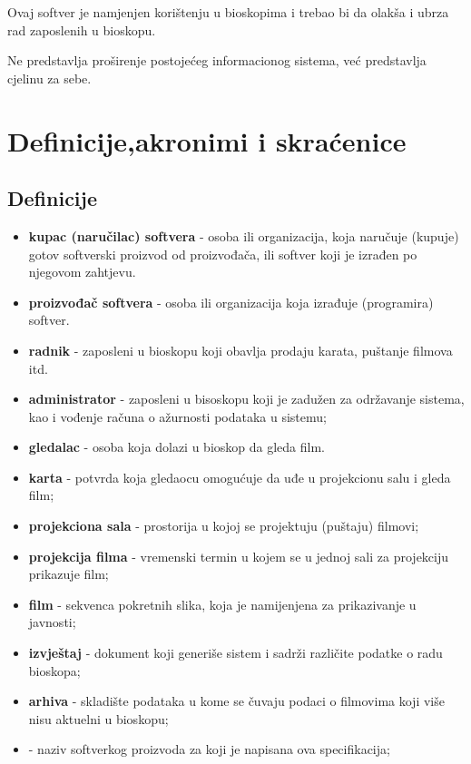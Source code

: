 Ovaj softver je namjenjen korištenju u bioskopima i trebao bi da olakša i ubrza rad zaposlenih u bioskopu.

Ne predstavlja proširenje postojećeg informacionog sistema, već predstavlja cjelinu za sebe.

\section{Definicije,akronimi i skraćenice}
\subsection{Definicije}

\begin{itemize}
\item \textbf{kupac (naručilac) softvera} - osoba ili organizacija, koja naručuje (kupuje) gotov softverski proizvod od proizvođača, ili softver koji je izrađen po njegovom zahtjevu. 
\item \textbf{proizvođač softvera} - osoba ili organizacija koja izrađuje (programira) softver.
\item \textbf{radnik} - zaposleni u bioskopu koji obavlja prodaju karata, puštanje filmova itd.
\item \textbf{administrator} - zaposleni u bisoskopu koji je zadužen za održavanje sistema, kao i vođenje računa o ažurnosti podataka u sistemu;
\item \textbf{gledalac} - osoba koja dolazi u bioskop da gleda film.

\item \textbf{karta} - potvrda koja gledaocu omogućuje da uđe u projekcionu salu i gleda film;

\item \textbf{projekciona sala} - prostorija u kojoj se projektuju (puštaju) filmovi;

\item \textbf{projekcija filma} - vremenski termin u kojem se u jednoj sali za projekciju prikazuje film;

\item \textbf{film} - sekvenca pokretnih slika, koja je namijenjena za prikazivanje u javnosti;

\item \textbf{izvještaj} - dokument koji generiše sistem i sadrži različite podatke o radu bioskopa;

\item \textbf{arhiva} - skladište podataka u kome se čuvaju podaci o filmovima koji više nisu aktuelni u bioskopu;

\item \textbf{\naziv } - naziv softverkog proizvoda za koji je napisana ova specifikacija;
\end{itemize}

